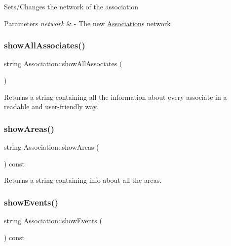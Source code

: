 Sets/\+Changes the network of the association


\begin{DoxyParams}{Parameters}
{\em network} & -\/ The new \mbox{\hyperlink{classAssociation}{Association}}\textquotesingle{}s network \\
\hline
\end{DoxyParams}
\mbox{\label{classAssociation_a266f2b14cd40429396b93ca29abcbf0c}} 
\subsubsection{\texorpdfstring{show\+All\+Associates()}{showAllAssociates()}}
{\footnotesize\ttfamily string Association\+::show\+All\+Associates (\begin{DoxyParamCaption}{ }\end{DoxyParamCaption})}



Returns a string containing all the information about every associate in a readable and user-\/friendly way. 

\mbox{\label{classAssociation_a149a29d7d7b59d15dadd84a2289c87e4}} 
\subsubsection{\texorpdfstring{show\+Areas()}{showAreas()}}
{\footnotesize\ttfamily string Association\+::show\+Areas (\begin{DoxyParamCaption}{ }\end{DoxyParamCaption}) const}



Returns a string containing info about all the areas. 

\mbox{\label{classAssociation_aff3817596c302056ca73ca6a98e7bf3c}} 
\subsubsection{\texorpdfstring{show\+Events()}{showEvents()}}
{\footnotesize\ttfamily string Association\+::show\+Events (\begin{DoxyParamCaption}{ }\end{DoxyParamCaption}) const}



